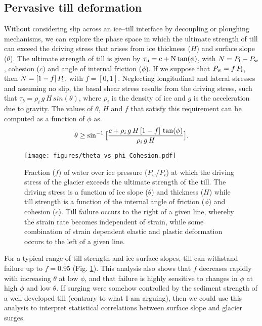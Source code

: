 \documentclass[review]{igs}
\begin{document}
\subsection{Pervasive till deformation}
Without considering slip across an ice--till interface by decoupling or ploughing mechanisms, we can explore the phase space in which the ultimate strength of till can exceed the driving stress that arises from ice thickness ($H$) and surface slope ($\theta$). The ultimate strength of till is given by $\rm \tau_u = c + N\,tan(\phi)$, with $N = P_{\rm{i}}-P_{\rm{w}}$, cohesion ($c$) and angle of internal friction ($\phi$). If we suppose that $P_{\rm{w}}= f\,P_{\rm{i}}$, then $N = [1-f]\,P_{\rm{i}}$, with $f = [0,1]$. Neglecting longitudinal and lateral stresses and assuming no slip, the basal shear stress results from the driving stress, such that $\tau_b = \rho_i\,g\,H\,sin(\theta)$, where $\rho_i$ is the density of ice and $g$ is the acceleration due to gravity. The values of $\theta$, $H$ and $f$ that satisfy this requirement can be computed as a function of $\phi$ as. 
\begin{equation}
\theta \geq \sin^{-1}\big{[}\frac{c+\rho_i\,g\,H\,[1-f]\,\tan(\phi)}{\rho_i\,g\,H}\big{]}.
\label{till}
\end{equation}

\begin{figure}[H]
  \centering
  \texttt{[image: figures/theta\_vs\_phi\_Cohesion.pdf]}
  \caption[]{Fraction ($f$) of water over ice pressure ($P_w/P_i$) at which the driving stress of the glacier exceeds the ultimate strength of the till. The driving stress is a function of ice slope ($\theta$) and thickness ($H$) while till strength is a function of the internal angle of friction ($\phi$) and cohesion ($c$). Till failure occurs to the right of a given line, whereby the strain rate becomes independent of strain, while some combination of strain dependent elastic and plastic deformation occurs to the left of a given line.}
\label{tps}
\end{figure}

For a typical range of till strength and ice surface slopes, till can withstand failure up to $f=0.95$ (Fig. \ref{tps}). This analysis also shows that $f$ decreases rapidly with increasing $\theta$ at low $\phi$, and that failure is highly sensitive to changes in $\phi$ at high $\phi$ and low $\theta$. If surging were somehow controlled by the sediment strength of a well developed till (contrary to what I am arguing), then we could use this analysis to interpret statistical correlations between surface slope and glacier surges. 
\end{document}
